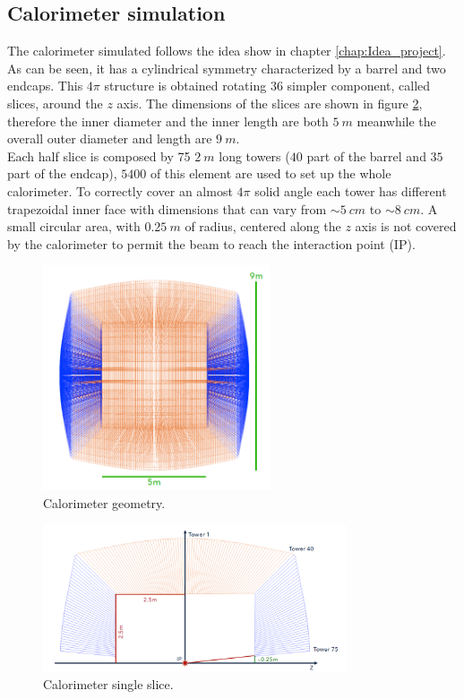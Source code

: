 \subsection{Calorimeter simulation} \label{subsec:Sim_cal}
The calorimeter simulated follows the idea show in chapter \ref{chap:Idea_project}. As can be seen, it has a cylindrical symmetry characterized by a barrel and two endcaps. This $4\pi$ structure is obtained rotating $36$ simpler component, called slices, around the $z$ axis. The dimensions of the slices are shown in figure \ref{fig:cal_slices}, therefore the inner diameter and  the inner length are both $5\ m$ meanwhile the overall outer diameter and length are $9\ m$.\\
Each half slice is composed by 75 $2\ m$ long towers ($40$ part of the barrel and $35$ part of the endcap), $5400$ of this element are used to set up the whole calorimeter.
To correctly cover an almost $4\pi$ solid angle each tower has different trapezoidal inner face with dimensions that can vary from $\sim 5\ cm$ to $\sim 8\ cm$.
A small circular area, with $0.25\ m$ of radius, centered along the $z$ axis is not covered by the calorimeter to permit the beam to reach the interaction point (IP).\\

\begin{figure}
	\centering
	\includegraphics[width=0.6\textwidth]{IMG/DRCGeometry3}
	\caption{Calorimeter geometry.}
	\label{fig:cal_geometry}
\end{figure}
\begin{figure}
	\centering
	\includegraphics[width=0.8\textwidth]{IMG/DRCGeometry1}
	\caption{Calorimeter single slice.}
	\label{fig:cal_slices}
\end{figure}


